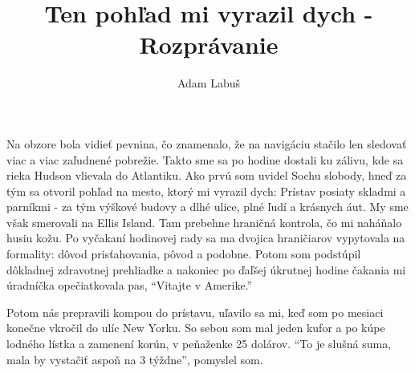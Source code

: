 \documentclass[12pt, a4paper]{article}
\title{%
	Ten pohľad mi vyrazil dych - Rozprávanie
}
\author{Adam Labuš}
\begin{document}
	\maketitle
Na obzore bola vidieť pevnina, čo znamenalo, že na navigáciu stačilo len sledovať viac a viac zaľudnené pobrežie.
Takto sme sa po hodine dostali ku zálivu, kde sa rieka Hudson vlievala do Atlantiku.
Ako prvú som uvidel Sochu slobody, hneď za tým sa otvoril pohľad na mesto, ktorý mi vyrazil dych:
Prístav posiaty skladmi a parníkmi - za tým výškové budovy a dlhé ulice, plné ľudí a krásnych áut.
My sme však smerovali na Ellis Island.
Tam prebehne hraničná kontrola, čo mi naháňalo husiu kožu.
Po vyčakaní hodinovej rady sa ma dvojica hraničiarov vypytovala na formality: dôvod prisťahovania, pôvod a podobne.
Potom som podstúpil dôkladnej zdravotnej prehliadke a nakoniec po ďaľšej úkrutnej hodine čakania mi úradníčka opečiatkovala pas, \enquote{Vitajte v Amerike.}

Potom nás prepravili kompou do prístavu, uľavilo sa mi, keď som po mesiaci konečne vkročil do ulíc New Yorku. So sebou som mal jeden kufor a po kúpe lodného lístka a zamenení korún, v peňaženke 25 dolárov. 
\enquote{To je slušná suma, mala by vystačiť aspoň na 3 týždne}, pomyslel som.
\end{document}
